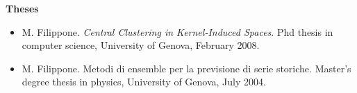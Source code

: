 \begin{itemize}
\end{itemize}\textbf{Theses}\begin{itemize}\item  M. Filippone. \emph{Central Clustering in Kernel-Induced Spaces}. Phd thesis in computer science, University of Genova, February 2008.  
\item  M. Filippone. Metodi di ensemble per la previsione di serie storiche. Master's degree thesis in physics, University of Genova, July 2004.  

\end{itemize}
